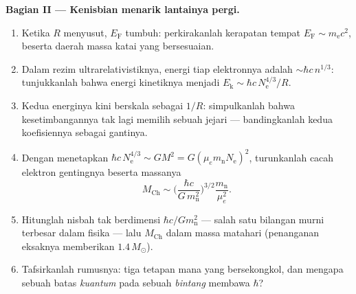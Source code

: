 \begin{problem}
\medskip\noindent\textbf{Bagian II --- Kenisbian menarik lantainya
pergi.}
\begin{enumerate}[resume]
  \item Ketika $R$ menyusut, $E_{\text{F}}$ tumbuh: perkirakanlah
        kerapatan tempat $E_{\text{F}} \sim m_{\text{e}}c^2$, beserta
        daerah massa katai yang bersesuaian.
  \item Dalam rezim ultrarelativistiknya, energi tiap elektronnya
        adalah $\sim\hbar c\,n^{1/3}$: tunjukkanlah bahwa energi
        kinetiknya menjadi
        $E_{\text{k}} \sim \hbar c\,N_{\text{e}}^{4/3}/R$.
  \item Kedua energinya kini berskala sebagai $1/R$: simpulkanlah
        bahwa kesetimbangannya tak lagi memilih sebuah jejari ---
        bandingkanlah kedua koefisiennya sebagai gantinya.
  \item Dengan menetapkan $\hbar c\,N_{\text{e}}^{4/3} \sim
        GM^2 = G(\mu_em_{\text{n}}N_{\text{e}})^2$, turunkanlah
        cacah elektron gentingnya beserta massanya
        \[
        M_{\text{Ch}} \sim
        \Big(\frac{\hbar c}{G\,m_{\text{n}}^2}\Big)^{3/2}
        \frac{m_{\text{n}}}{\mu_e^2} .
        \]
  \item Hitunglah nisbah tak berdimensi $\hbar c/Gm_{\text{n}}^2$
        --- salah satu bilangan murni terbesar dalam fisika --- lalu
        $M_{\text{Ch}}$ dalam massa matahari (penanganan eksaknya
        memberikan $1.4\,M_\odot$).
  \item Tafsirkanlah rumusnya: tiga tetapan mana yang bersekongkol, dan
        mengapa sebuah batas \emph{kuantum} pada sebuah \emph{bintang}
        membawa $\hbar$?
\end{enumerate}


\end{problem}
